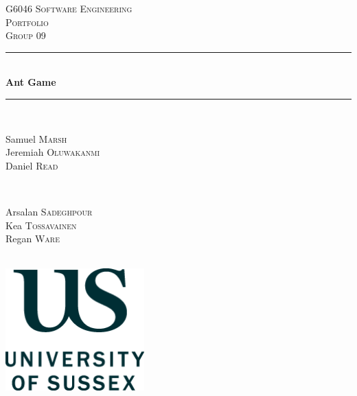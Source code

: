 \documentclass[12pt]{article}
\begin{document}
\begin{titlepage}

\newcommand{\HRule}{\rule{\linewidth}{0.5mm}}

\center

\textsc{\LARGE G6046 Software Engineering}\\[1.5cm]
\textsc{\Large Portfolio}\\[0.5cm]
\textsc{\large Group 09}\\[0.5cm]

\HRule \\[0.4cm]
{ \huge \bfseries Ant Game}\\[0.4cm] 
\HRule \\[1.5cm]

\begin{minipage}{0.4\textwidth}
\center
\begin{flushleft} \large
Samuel \textsc{Marsh}\\
Jeremiah \textsc{Oluwakanmi}\\
Daniel \textsc{Read}
\end{flushleft}
\end{minipage}
~
\begin{minipage}{0.4\textwidth}
\begin{flushright} \large
Arsalan \textsc{Sadeghpour}\\
Kea \textsc{Tossavainen}\\
Regan \textsc{Ware}
\end{flushright}
\end{minipage}\\[2cm]

\includegraphics[width=0.4\textwidth]{images/sussex-logo.png}\\[1cm]

\vfill

\end{titlepage}

\tableofcontents









\end{document}

